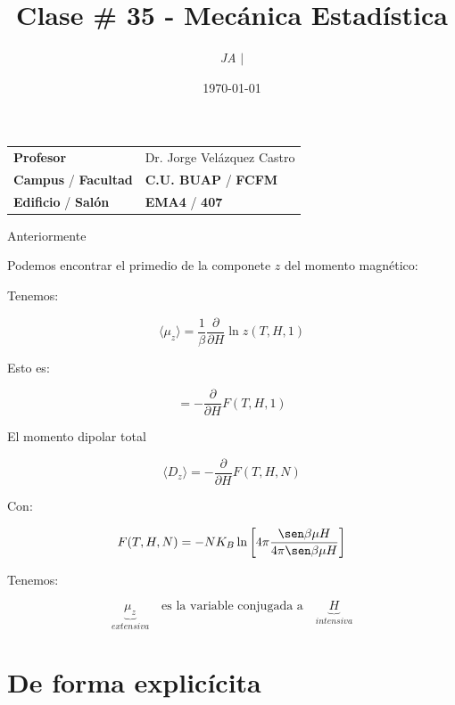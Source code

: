 \documentclass{article}
\title{Clase \# 35 - Mecánica Estadística}
\author{\emph{JA} $\boldsymbol{\mid}$}
\date{\today}
\begin{document}
\maketitle



\begin{mybox}
\noindent\begin{tabular}{@{}ll}
	{\bfseries{Profesor}} & Dr. Jorge Velázquez Castro\\
	\textcolor{prussianblue}{\bfseries{Campus}} / \textcolor{trueblue}{\bfseries{Facultad}}  & \textcolor{prussianblue}{\bfseries{C.U. BUAP}} /  \textcolor{trueblue}{\bfseries{FCFM}} \\
	\textcolor{prussianblue}{\bfseries{Edificio}} /  \textcolor{trueblue}{\bfseries{Salón}}    & 	\textcolor{prussianblue}{\bfseries{EMA4}} /  \textcolor{trueblue}{\bfseries{407}}   
\end{tabular} 
\end{mybox} \vspace{1cm}

\tableofcontents

\vspace{2cm}

Anteriormente

Podemos encontrar el primedio de la componete $z$ del momento magnético:

Tenemos:


\[ \langle \mu_{z}  \rangle = \frac{1}{\beta}  \frac{\partial }{\partial H} \ln z (T,H,1) \]

Esto es:

\[   = - \frac{\partial}{\partial H} F(T,H,1)   \]



El momento dipolar total


\[ \langle D_{z} \rangle = - \frac{\partial}{\partial H} F(T,H,N) \]

Con:


\[ F(T,H,N) = -N K_{B}\ln \left[    4\pi \frac{\sen \beta \mu H}{4\pi \sen \beta \mu H}    \right]  \]

Tenemos:

\[  \underbrace{\mu_{z}}_{extensiva} \quad \text{es la variable conjugada a} \quad \underbrace{H}_{intensiva} \]

\section{De forma explicícita}
\end{document}
